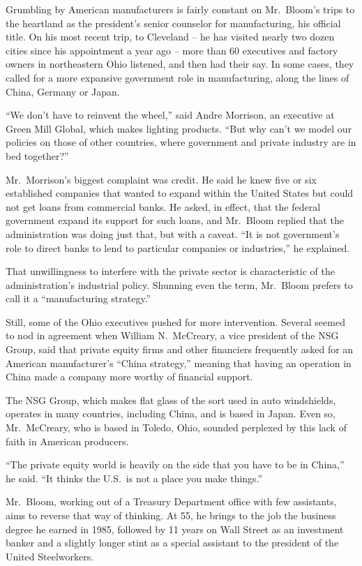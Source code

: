 ﻿\documentclass[12pt]{article}
\begin{document}
Grumbling by American manufacturers is fairly constant on Mr.~Bloom's trips to the heartland as the
president's senior counselor for manufacturing, his official title. On his most recent trip, to
Cleveland -- he has visited nearly two dozen cities since his appointment a year ago -- more than 60
executives and factory owners in northeastern Ohio listened, and then had their say. In some cases,
they called for a more expansive government role in manufacturing, along the lines of China, Germany
or Japan.

``We don't have to reinvent the wheel,'' said Andre Morrison, an executive at Green Mill Global,
which makes lighting products. ``But why can't we model our policies on those of other countries,
where government and private industry are in bed together?''

Mr.~Morrison's biggest complaint was credit. He said he knew five or six established companies that
wanted to expand within the United States but could not get loans from commercial banks. He asked,
in effect, that the federal government expand its support for such loans, and Mr.~Bloom replied that
the administration was doing just that, but with a caveat. ``It is not government's role to direct
banks to lend to particular companies or industries,'' he explained.

That unwillingness to interfere with the private sector is characteristic of the administration's
industrial policy. Shunning even the term, Mr.~Bloom prefers to call it a ``manufacturing
strategy.''

Still, some of the Ohio executives pushed for more intervention. Several seemed to nod in agreement
when William N.~McCreary, a vice president of the NSG Group, said that private equity firms and
other financiers frequently asked for an American manufacturer's ``China strategy,'' meaning that
having an operation in China made a company more worthy of financial support.

The NSG Group, which makes flat glass of the sort used in auto windshields, operates in many
countries, including China, and is based in Japan. Even so, Mr.~McCreary, who is based in Toledo,
Ohio, sounded perplexed by this lack of faith in American producers.

``The private equity world is heavily on the side that you have to be in China,'' he said. ``It
thinks the U.S.~is not a place you make things.''

Mr.~Bloom, working out of a Treasury Department office with few assistants, aims to reverse that way
of thinking. At 55, he brings to the job the business degree he earned in 1985, followed by 11 years
on Wall Street as an investment banker and a slightly longer stint as a special assistant to the
president of the United Steelworkers.
\end{document}
